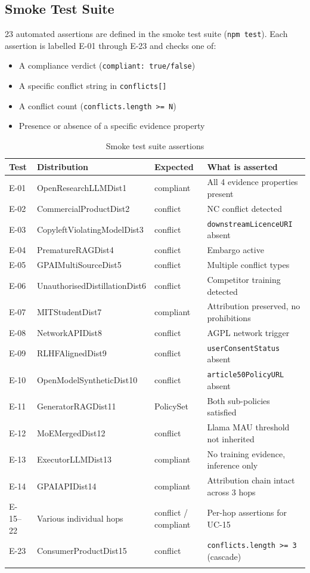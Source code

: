 \documentclass[12pt,a4paper]{article}
\begin{document}
\subsection{Smoke Test Suite}

23 automated assertions are defined in the smoke test suite (\texttt{npm test}). Each assertion is labelled E-01 through E-23 and checks one of:

\begin{itemize}[noitemsep]
  \item A compliance verdict (\texttt{compliant: true/false})
  \item A specific conflict string in \texttt{conflicts[]}
  \item A conflict count (\texttt{conflicts.length >= N})
  \item Presence or absence of a specific evidence property
\end{itemize}

\begin{longtable}{@{}p{1.2cm}p{5cm}p{2.5cm}p{5.5cm}@{}}
\toprule
\textbf{Test} & \textbf{Distribution} & \textbf{Expected} & \textbf{What is asserted} \\
\midrule
\endhead
E-01 & OpenResearchLLMDist1 & compliant & All 4 evidence properties present \\
E-02 & CommercialProductDist2 & conflict & NC conflict detected \\
E-03 & CopyleftViolatingModelDist3 & conflict & \texttt{downstreamLicenceURI} absent \\
E-04 & PrematureRAGDist4 & conflict & Embargo active \\
E-05 & GPAIMultiSourceDist5 & conflict & Multiple conflict types \\
E-06 & UnauthorisedDistillationDist6 & conflict & Competitor training detected \\
E-07 & MITStudentDist7 & compliant & Attribution preserved, no prohibitions \\
E-08 & NetworkAPIDist8 & conflict & AGPL network trigger \\
E-09 & RLHFAlignedDist9 & conflict & \texttt{userConsentStatus} absent \\
E-10 & OpenModelSyntheticDist10 & conflict & \texttt{article50PolicyURL} absent \\
E-11 & GeneratorRAGDist11 & PolicySet & Both sub-policies satisfied \\
E-12 & MoEMergedDist12 & conflict & Llama MAU threshold not inherited \\
E-13 & ExecutorLLMDist13 & compliant & No training evidence, inference only \\
E-14 & GPAIAPIDist14 & compliant & Attribution chain intact across 3 hops \\
E-15--22 & Various individual hops & conflict / compliant & Per-hop assertions for UC-15 \\
E-23 & ConsumerProductDist15 & conflict & \texttt{conflicts.length >= 3} (cascade) \\
\bottomrule
\caption{Smoke test suite assertions}
\end{longtable}
\end{document}

